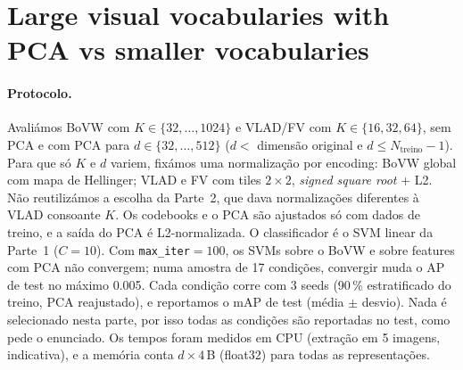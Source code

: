 \section{Large visual vocabularies with PCA vs smaller vocabularies}
\label{sec:part3}

\paragraph{Protocolo.}
Avaliámos BoVW com $K \in \{32,\dots,1024\}$ e VLAD/FV com $K \in \{16,32,64\}$,
sem PCA e com PCA para $d \in \{32,\dots,512\}$ ($d < $ dimensão original e
$d \le N_{\text{treino}}-1$). Para que só $K$ e $d$ variem, fixámos uma
normalização por encoding: BoVW global com mapa de Hellinger; VLAD e FV com
tiles $2\times2$, \emph{signed square root} + L2. Não reutilizámos a escolha
da Parte~2, que dava normalizações diferentes à VLAD consoante $K$. Os
codebooks e o PCA são ajustados só com dados de treino, e a saída do PCA é
L2-normalizada. O classificador é o SVM linear da Parte~1 ($C=10$). Com
\texttt{max\_iter}$=100$, os SVMs sobre o BoVW e sobre features com PCA não
convergem; numa amostra de 17 condições, convergir muda o AP de test no máximo
0.005. Cada
condição corre com 3 seeds (90\,\% estratificado do treino, PCA reajustado), e
reportamos o mAP de test (média $\pm$ desvio). Nada é selecionado nesta parte,
por isso todas as condições são reportadas no test, como pede o enunciado. Os
tempos foram medidos em CPU (extração em 5 imagens, indicativa), e a memória
conta $d \times 4$\,B (float32) para todas as representações.

